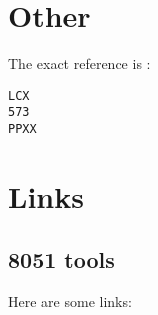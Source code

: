 \documentclass[a4paper,12pt]{article}
\begin{document}
\section{Other}

The exact reference is :
\begin{verbatim}
LCX
573
PPXX
\end{verbatim}

\section{Links}

\subsection{8051 tools}

Here are some links:
\end{document}
